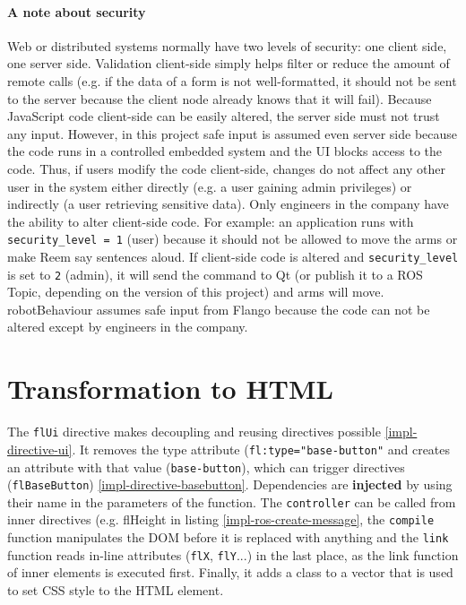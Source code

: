 \paragraph{A note about security} Web or distributed systems normally have two levels of security: one client side, one server side.
Validation client-side simply helps filter or reduce the amount of remote calls (e.g. if the data of a form is not well-formatted, it should not be sent to the server because the client node already knows that it will fail).
Because JavaScript code client-side can be easily altered, the server side must not trust any input.
However, in this project safe input is assumed even server side because the code runs in a controlled embedded system and the \ac{UI} blocks access to the code.
Thus, if users modify the code client-side, changes do not affect any other user in the system either directly (e.g. a user gaining admin privileges) or indirectly (a user retrieving sensitive data).
Only engineers in the company have the ability to alter client-side code.
For example: an application runs with \lstinline$security_level = 1$ (user) because it should not be allowed to move the arms or make Reem say sentences aloud.
If client-side code is altered and \lstinline$security_level$ is set to \lstinline$2$ (admin), it will send the command to Qt (or publish it to a \ac{ROS} Topic, depending on the version of this project) and arms will move.
robotBehaviour assumes safe input from Flango \cm because the code can not be altered except by engineers in the company.

\section{Transformation to \ac{HTML}}
The \texttt{flUi} directive makes decoupling and reusing directives possible \ref{impl-directive-ui}.
It removes the type attribute (\texttt{fl:type="base-button"} and creates an attribute with that value (\texttt{base-button}), which can trigger directives (\texttt{flBaseButton}) \ref{impl-directive-basebutton}.
Dependencies are \textbf{injected} by using their name in the parameters of the function.
The \texttt{controller} can be called from inner directives (e.g. flHeight in listing \ref{impl-ros-create-message}, the \texttt{compile} function manipulates the \ac{DOM} before it is replaced with anything and the \texttt{link} function reads in-line attributes (\texttt{flX}, \texttt{flY}...) in the last place, as the link function of inner elements is executed first.
Finally, it adds a class to a vector that is used to set \ac{CSS} style to the \ac{HTML} element.

